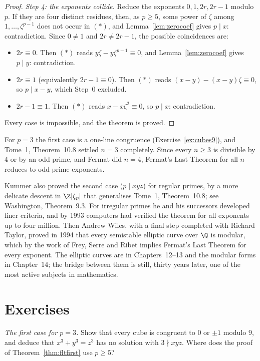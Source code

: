 \begin{proof}
\emph{Step 4: the exponents collide.} Reduce the exponents $0,1,2r,2r-1$ modulo $p$. If they are four distinct residues,
then, as $p\ge5$, some power of $\zeta$ among $1,\dots,\zeta^{p-1}$ does not occur in $(*)$, and Lemma~\ref{lem:zerocoef} gives
$p\mid x$: contradiction. Since $0\ne1$ and $2r\ne2r-1$, the possible coincidences are:
\begin{itemize}
\item $2r\equiv0$. Then $(*)$ reads $y\zeta-y\zeta^{p-1}\equiv0$, and Lemma~\ref{lem:zerocoef} gives $p\mid y$: contradiction.
\item $2r\equiv1$ (equivalently $2r-1\equiv0$). Then $(*)$ reads $(x-y)-(x-y)\zeta\equiv0$, so $p\mid x-y$, which Step~0 excluded.
\item $2r-1\equiv1$. Then $(*)$ reads $x-x\zeta^2\equiv0$, so $p\mid x$: contradiction.
\end{itemize}
Every case is impossible, and the theorem is proved.
\end{proof}

For $p=3$ the first case is a one-line congruence (Exercise~\ref{ex:cubes9}), and Tome~1, Theorem~10.8 settled $n=3$
completely. Since every $n\ge3$ is divisible by $4$ or by an odd prime, and Fermat did $n=4$, Fermat's Last Theorem for all
$n$ reduces to odd prime exponents.

\begin{remark}
Kummer also proved the second case ($p\mid xyz$) for regular primes, by a more delicate descent in $\Z[\zeta_p]$ that
generalises Tome~1, Theorem~10.8; see Washington, Theorem~9.3. For irregular primes he and his successors developed finer
criteria, and by 1993 computers had verified the theorem for all exponents up to four million. Then Andrew Wiles, with a
final step completed with Richard Taylor, proved in 1994 that every semistable elliptic curve over $\Q$ is modular, which by
the work of Frey, Serre and Ribet implies Fermat's Last Theorem for every exponent. The elliptic curves are in
Chapters~12--13 and the modular forms in Chapter~14; the bridge between them is still, thirty years later, one of the most
active subjects in mathematics.
\end{remark}

\section{Exercises}

\begin{exercise}[$\star$]\label{ex:cubes9}
\emph{The first case for $p=3$.} Show that every cube is congruent to $0$ or $\pm1$ modulo $9$, and deduce that $x^3+y^3=z^3$
has no solution with $3\nmid xyz$. Where does the proof of Theorem~\ref{thm:fltfirst} use $p\ge5$?
\end{exercise}

